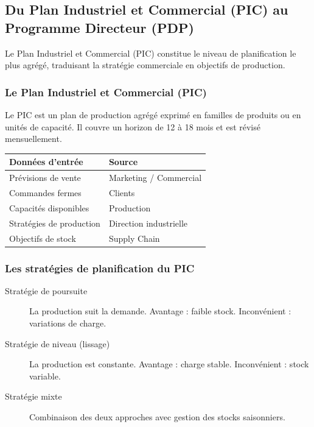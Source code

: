 \documentclass{article}
\begin{document}
\begin{table}[h]
\subsection{Du Plan Industriel et Commercial (PIC) au Programme Directeur (PDP)}

Le Plan Industriel et Commercial (PIC) constitue le niveau de planification le plus agrégé, traduisant la stratégie commerciale en objectifs de production.

\subsubsection{Le Plan Industriel et Commercial (PIC)}

\begin{tcolorbox}[colback=blueclair, colframe=blue!70!black, title=Définition du PIC]
Le PIC est un plan de production agrégé exprimé en familles de produits ou en unités de capacité. Il couvre un horizon de 12 à 18 mois et est révisé mensuellement.
\end{tcolorbox}

\begin{table}[h]
\centering
\begin{tabular}{|p{}|p{}|}
\hline
\textbf{Données d'entrée} & \textbf{Source} \\
\hline
Prévisions de vente & Marketing / Commercial \\
Commandes fermes & Clients \\
Capacités disponibles & Production \\
Stratégies de production & Direction industrielle \\
Objectifs de stock & Supply Chain \\
\hline
\end{tabular}
\end{table}

\subsubsection{Les stratégies de planification du PIC}

\begin{tcolorbox}[colback=grisclair, colframe=gray!70!black, title=Stratégies de planification]
\begin{description}
    \item[Stratégie de poursuite] La production suit la demande. Avantage : faible stock. Inconvénient : variations de charge.
    \item[Stratégie de niveau (lissage)] La production est constante. Avantage : charge stable. Inconvénient : stock variable.
    \item[Stratégie mixte] Combinaison des deux approches avec gestion des stocks saisonniers.
\end{description}
\end{tcolorbox}


\end{table}
\end{document}
